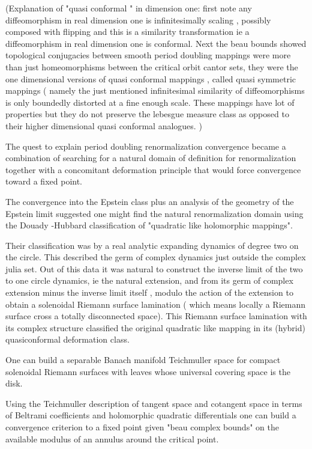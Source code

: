 \begin{description}
 (Explanation  of "quasi conformal " in dimension one: first note any diffeomorphism in real dimension one is infinitesimally  scaling , possibly composed with flipping   and this is a similarity transformation  ie a diffeomorphism in real dimension one is conformal.  Next  the beau bounds showed  topological conjugacies between smooth  period doubling mappings were more than just homeomorphisms between the critical orbit  cantor sets, they were the one dimensional versions of quasi conformal mappings , called quasi symmetric mappings ( namely the just mentioned  infinitesimal similarity of diffeomorphisms  is only boundedly distorted at a fine enough scale. These mappings have lot of properties  but  they do not  preserve the lebesgue measure class  as opposed to  their higher dimensional  quasi conformal analogues. )

The quest to explain  period doubling renormalization convergence became a combination of searching for  a  natural domain of  definition for renormalization  together with a concomitant deformation principle that would  force  convergence toward  a fixed point.

The convergence into the Epstein class  plus  an analysis of the geometry of the Epstein limit suggested one  might find the natural renormalization domain using the Douady -Hubbard classification of  "quadratic like  holomorphic mappings".

Their classification was  by a  real analytic expanding dynamics of degree two  on the circle.  This described the germ of complex dynamics just outside the complex julia set.
Out of this data  it was  natural to construct  the  inverse limit of the two to one  circle dynamics, ie the natural extension, and from its germ of complex extension minus  the inverse limit itself , modulo the  action of the extension to obtain a solenoidal Riemann surface lamination ( which means locally a Riemann surface cross a totally disconnected space). This Riemann surface lamination with its complex structure classified the original quadratic like mapping in its (hybrid) quasiconformal deformation class.

 One  can build a separable Banach manifold  Teichmuller space for  compact solenoidal Riemann surfaces with leaves whose universal covering space is the disk.

Using the Teichmuller description of tangent space and cotangent space in terms of Beltrami coefficients and holomorphic quadratic differentials one   can   build a convergence criterion to a fixed point  given   "beau complex bounds" on the  available modulus of an annulus  around the critical point.


\end{description}
